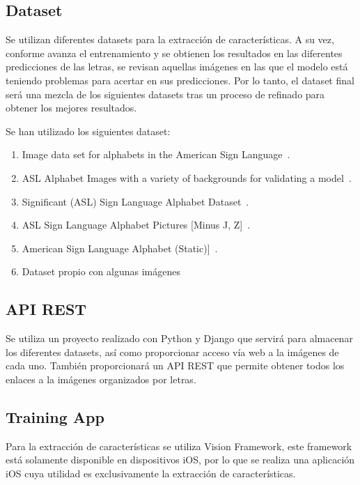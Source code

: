 \documentclass[../main.tex]{subfiles}
\begin{document}
\subsection { Dataset }

Se utilizan diferentes datasets para la extracción de características. A su vez, conforme avanza el entrenamiento y se obtienen los resultados en las diferentes predicciones de las letras, se revisan aquellas imágenes en las que el modelo está teniendo problemas para acertar en sus predicciones. Por lo tanto, el dataset final será una mezcla de los siguientes datasets tras un proceso de refinado para obtener los mejores resultados.

Se han utilizado los siguientes dataset:

\begin{enumerate}
    \item Image data set for alphabets in the American Sign Language~\cite{ASLALPHABET}.
    \item ASL Alphabet Images with a variety of backgrounds for validating a model~\cite{ASLALPHABET2}.
    \item Significant (ASL) Sign Language Alphabet Dataset~\cite{ASLALPHABET4}.
    \item ASL Sign Language Alphabet Pictures [Minus J, Z]~\cite{ASLALPHABET5}.
    \item American Sign Language Alphabet (Static)]~\cite{ASLALPHABET6}.
    \item Dataset propio con algunas imágenes
\end{enumerate}

\subsection { API REST }

Se utiliza un proyecto realizado con Python y Django que servirá para almacenar los diferentes datasets, así como proporcionar acceso vía web a la imágenes de cada uno. También proporcionará un API REST que permite obtener todos los enlaces a la imágenes organizados por letras. 

\subsection { Training App}

Para la extracción de características se utiliza Vision Framework, este framework está solamente disponible en dispositivos iOS, por lo que se realiza una aplicación iOS cuya utilidad es exclusivamente la extracción de características. 
\end{document}
